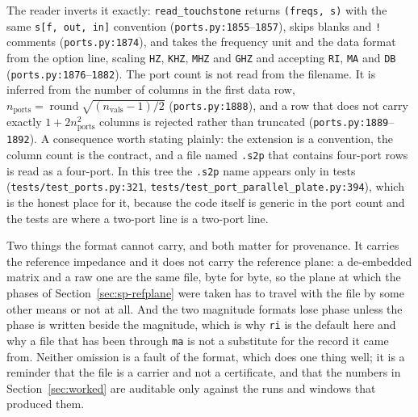 The reader inverts it exactly: \texttt{read\_touchstone} returns \texttt{(freqs, s)} with the same
\texttt{s[f,\ out,\ in]} convention (\texttt{ports.py:1855}--\texttt{1857}), skips blanks and \texttt{!}
comments (\texttt{ports.py:1874}), and takes the frequency unit and the data format from the option line, scaling
\texttt{HZ}, \texttt{KHZ}, \texttt{MHZ} and \texttt{GHZ} and accepting \texttt{RI}, \texttt{MA} and \texttt{DB}
(\texttt{ports.py:1876}--\texttt{1882}). The port count is not read from the filename. It is inferred from the
number of columns in the first data row, $n_{\text{ports}}=\operatorname{round}\sqrt{(n_{\text{vals}}-1)/2}$
(\texttt{ports.py:1888}), and a row that does not carry exactly $1+2n_{\text{ports}}^2$ columns is rejected rather
than truncated (\texttt{ports.py:1889}--\texttt{1892}). A consequence worth stating plainly: the extension is a
convention, the column count is the contract, and a file named \texttt{.s2p} that contains four-port rows is read as
a four-port. In this tree the \texttt{.s2p} name appears only in tests
(\texttt{tests/test\_ports.py:321}, \texttt{tests/test\_port\_parallel\_plate.py:394}), which is the honest place
for it, because the code itself is generic in the port count and the tests are where a two-port line is a
two-port line.

Two things the format cannot carry, and both matter for provenance. It carries the reference impedance and it does
not carry the reference plane: a de-embedded matrix and a raw one are the same file, byte for byte, so the plane at
which the phases of Section~\ref{sec:sp-refplane} were taken has to travel with the file by some other means or not
at all. And the two magnitude formats lose phase unless the phase is written beside the magnitude, which is why
\texttt{ri} is the default here and why a file that has been through \texttt{ma} is not a substitute for the record
it came from. Neither omission is a fault of the format, which does one thing well; it is a reminder that the file
is a carrier and not a certificate, and that the numbers in
Section~\ref{sec:worked} are auditable only against the runs and windows that produced them.

